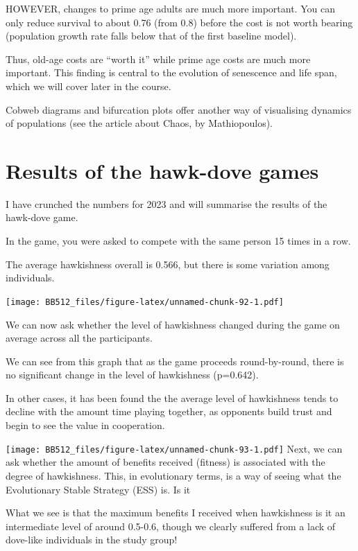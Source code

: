 \documentclass[
  a4paper]{book}
\begin{document}
HOWEVER, changes to prime age adults are much more important. You can only reduce survival to about 0.76 (from 0.8) before the cost is not worth bearing (population growth rate falls below that of the first baseline model).

Thus, old-age costs are ``worth it'' while prime age costs are much more important. This finding is central to the evolution of senescence and life span, which we will cover later in the course.

Cobweb diagrams and bifurcation plots offer another way of visualising dynamics of populations (see the article about Chaos, by Mathiopoulos).

\hypertarget{results-of-the-hawk-dove-games}{%
\section{Results of the hawk-dove games}\label{results-of-the-hawk-dove-games}}

I have crunched the numbers for 2023 and will summarise the results of the hawk-dove game.

In the game, you were asked to compete with the same person 15 times in a row.

The average hawkishness overall is 0.566, but there is some variation among individuals.

\texttt{[image: BB512\_files/figure-latex/unnamed-chunk-92-1.pdf]}

We can now ask whether the level of hawkishness changed during the game on average across all the participants.

We can see from this graph that as the game proceeds round-by-round, there is no significant change in the level of hawkishness (p=0.642).

In other cases, it has been found the the average level of hawkishness tends to decline with the amount time playing together, as opponents build trust and begin to see the value in cooperation.

\texttt{[image: BB512\_files/figure-latex/unnamed-chunk-93-1.pdf]}
Next, we can ask whether the amount of benefits received (fitness) is associated with the degree of hawkishness. This, in evolutionary terms, is a way of seeing what the Evolutionary Stable Strategy (ESS) is. Is it

What we see is that the maximum benefits I received when hawkishness is it an intermediate level of around 0.5-0.6, though we clearly suffered from a lack of dove-like individuals in the study group!
\end{document}
